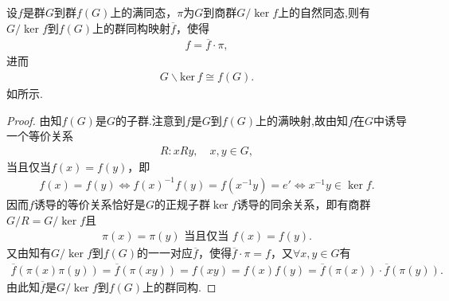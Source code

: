 \documentclass[../../main.tex]{subfiles}%
\begin{document}
\begin{theorem}[群的同态基本定理]\label{theorem:群的同态基本定理}
设$f$是群$G$到群$f(G)$上的满同态，$\pi$为$G$到商群$G/\ker f$上的自然同态,则有$G/\ker f$到$f(G)$上的群同构映射$\overline{f}$，使得
\begin{align}
f = \overline{f} \cdot \pi, \label{eq:1.gdgp9343f43dc3237.123r3te4g45y4h5h56}
\end{align}
进而
\begin{align*}
G\backslash \mathrm{ker}\,f\cong  f(G).
\end{align*}
如所示.
\end{theorem}
\begin{note}
\begin{figure}[H]
\centering
\caption{}
\label{figure:图1.7}
\end{figure}
\end{note}
\begin{proof}

由知$f(G)$是$G$的子群.注意到$f$是$G$到$f(G)$上的满映射,故由知$f$在$G$中诱导一个等价关系
\begin{align*}
R: xRy, \quad x, y \in G,
\end{align*}
当且仅当$f(x) = f(y)$，即
\begin{align*}
f(x)=f(y) \iff f(x)^{-1}f(y) = f(x^{-1}y) = e'\iff x^{-1}y \in \ker f .
\end{align*}
因而$f$诱导的等价关系恰好是$G$的正规子群$\ker f$诱导的同余关系，即有商群$G/R = G/\ker f$且
\begin{align*}
\pi(x) = \pi(y) \text{ 当且仅当 } f(x) = f(y).
\end{align*}
又由知有$G/\ker f$到$f(G)$的一一对应$\overline{f}$，使得$\overline{f} \cdot \pi = f$，又$\forall x, y \in G$有
\begin{align*}
\overline{f}(\pi(x)\pi(y)) = \overline{f}(\pi(xy)) = f(xy) = f(x)f(y) = \overline{f}(\pi(x)) \cdot \overline{f}(\pi(y)).
\end{align*}
由此知$\overline{f}$是$G/\ker f$到$f(G)$上的群同构.


\end{proof}
\end{document}
